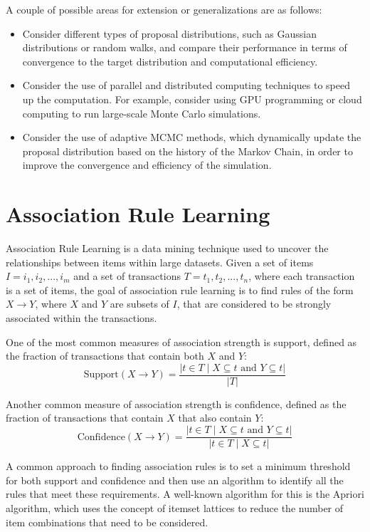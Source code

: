 \documentclass{article}
\begin{document}
    \vspace{3mm}
    A couple of possible areas for extension or generalizations are as follows:
    \begin{itemize}
        \item Consider different types of proposal distributions, such as Gaussian distributions or random walks, and compare their performance in terms of convergence to the target distribution and computational efficiency.
        \item Consider the use of parallel and distributed computing techniques to speed up the computation. For example, consider using GPU programming or cloud computing to run large-scale Monte Carlo simulations.
        \item Consider the use of adaptive MCMC methods, which dynamically update the proposal distribution based on the history of the Markov Chain, in order to improve the convergence and efficiency of the simulation.
    \end{itemize}

\pagebreak 

\section{Association Rule Learning}
    Association Rule Learning is a data mining technique used to uncover the relationships between items within large datasets. Given a set of items $I = {i_{1}, i_{2}, ..., i_{m}}$ and a set of transactions $T = {t_{1}, t_{2}, ..., t_{n}}$, where each transaction is a set of items, the goal of association rule learning is to find rules of the form $X \rightarrow Y$, where $X$ and $Y$ are subsets of $I$, that are considered to be strongly associated within the transactions.

    \vspace{3mm}
    One of the most common measures of association strength is support, defined as the fraction of transactions that contain both $X$ and $Y$: $$\text{Support}(X \rightarrow Y) = \frac{|{t \in T \mid X \subseteq t \text{\ and\ } Y \subseteq t}|}{|T|}$$

    Another common measure of association strength is confidence, defined as the fraction of transactions that contain $X$ that also contain $Y$: $$\text{Confidence}(X \rightarrow Y) = \frac{|{t \in T \mid X \subseteq t \text{\ and\ } Y \subseteq t}|}{|{t \in T \mid X \subseteq t}|}$$
    
    A common approach to finding association rules is to set a minimum threshold for both support and confidence and then use an algorithm to identify all the rules that meet these requirements. A well-known algorithm for this is the Apriori algorithm, which uses the concept of itemset lattices to reduce the number of item combinations that need to be considered.
\end{document}
